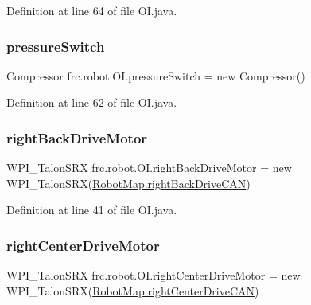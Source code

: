 Definition at line 64 of file O\+I.\+java.

\mbox{\label{classfrc_1_1robot_1_1OI_a68157a4a30cc0fae8bc36ae0ac999c82}} 
\subsubsection{\texorpdfstring{pressure\+Switch}{pressureSwitch}}
{\footnotesize\ttfamily Compressor frc.\+robot.\+O\+I.\+pressure\+Switch = new Compressor()\hspace{0.3cm}{\ttfamily [static]}}



Definition at line 62 of file O\+I.\+java.

\mbox{\label{classfrc_1_1robot_1_1OI_a5f2937beffdc7dd1d937aaff36f20c1e}} 
\subsubsection{\texorpdfstring{right\+Back\+Drive\+Motor}{rightBackDriveMotor}}
{\footnotesize\ttfamily W\+P\+I\+\_\+\+Talon\+S\+RX frc.\+robot.\+O\+I.\+right\+Back\+Drive\+Motor = new W\+P\+I\+\_\+\+Talon\+S\+RX(\hyperlink{classfrc_1_1robot_1_1RobotMap_a0fb2fff6bf26e3f196d1cb02a89072c3}{Robot\+Map.\+right\+Back\+Drive\+C\+AN})\hspace{0.3cm}{\ttfamily [static]}}



Definition at line 41 of file O\+I.\+java.

\mbox{\label{classfrc_1_1robot_1_1OI_a9be3279c18d1f3433d6b07c706eb1457}} 
\subsubsection{\texorpdfstring{right\+Center\+Drive\+Motor}{rightCenterDriveMotor}}
{\footnotesize\ttfamily W\+P\+I\+\_\+\+Talon\+S\+RX frc.\+robot.\+O\+I.\+right\+Center\+Drive\+Motor = new W\+P\+I\+\_\+\+Talon\+S\+RX(\hyperlink{classfrc_1_1robot_1_1RobotMap_a3ca36356410531e52126d2979ee17f13}{Robot\+Map.\+right\+Center\+Drive\+C\+AN})\hspace{0.3cm}{\ttfamily [static]}}



